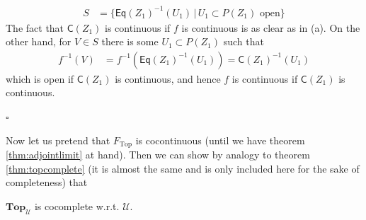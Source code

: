 \begin{prf}
\begin{enumerate}
\begin{align*}
  S
  &=
  \lbrace
      \mathsf{Eq}(Z_{1})^{-1}(U_{1})
    \,
    \vert
    \,
      U_{1}
      \subset
      P(Z_{1})
      \text{ open}
  \rbrace
\end{align*}
The fact that $\mathsf{C}(Z_{1})$ is continuous if $f$ is continuous is as clear as in (a).
On the other hand, for $V \in S$ there is some $U_{1} \subset P(Z_{1})$ such that
\begin{align*}
  f^{-1}(V)
  &=
  f^{-1}(\mathsf{Eq}(Z_{1})^{-1}(U_{1}))
  =
  \mathsf{C}(Z_{1})^{-1}(U_{1})
\end{align*}
which is open if $\mathsf{C}(Z_{1})$ is continuous, and hence $f$ is continuous if $\mathsf{C}(Z_{1})$ is continuous.
\end{enumerate}
\phantom{proven}
\hfill
$\square$
\end{prf}
Now let us pretend that $F_{\mathrm{Top}}$ is cocontinuous (until we have theorem \ref{thm:adjointlimit} at hand).
Then we can show by analogy to theorem \ref{thm:topcomplete} (it is almost the same and is only included here for the sake of completeness) that
\\
\begin{thm}
\label{thm:topcocomplete}
$\mathbf{Top}_{\mathcal{U}}$ is cocomplete w.r.t. $\mathcal{U}$.
\end{thm}
